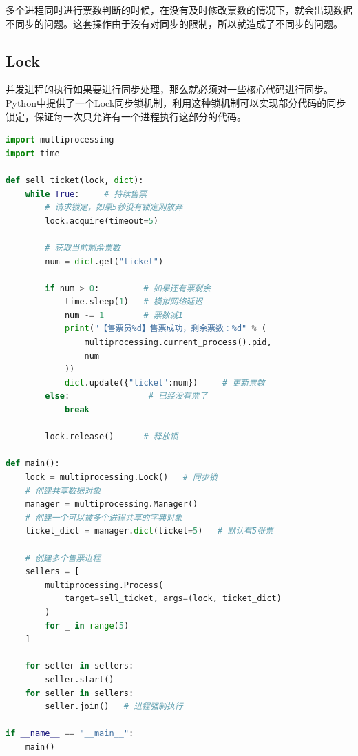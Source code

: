 多个进程同时进行票数判断的时候，在没有及时修改票数的情况下，就会出现数据不同步的问题。这套操作由于没有对同步的限制，所以就造成了不同步的问题。\\

\subsection{Lock}

并发进程的执行如果要进行同步处理，那么就必须对一些核心代码进行同步。Python中提供了一个Lock同步锁机制，利用这种锁机制可以实现部分代码的同步锁定，保证每一次只允许有一个进程执行这部分的代码。

\begin{table}[H]
	\centering
	\caption{Lock类}
\end{table}


\begin{lstlisting}[language=Python]
import multiprocessing
import time

def sell_ticket(lock, dict):
	while True:     # 持续售票
		# 请求锁定，如果5秒没有锁定则放弃
		lock.acquire(timeout=5)
		
		# 获取当前剩余票数
		num = dict.get("ticket")
		
		if num > 0:         # 如果还有票剩余
			time.sleep(1)   # 模拟网络延迟
			num -= 1        # 票数减1
			print("【售票员%d】售票成功，剩余票数：%d" % (
				multiprocessing.current_process().pid,
				num
			))
			dict.update({"ticket":num})     # 更新票数
		else:                # 已经没有票了
			break
		
		lock.release()      # 释放锁

def main():
	lock = multiprocessing.Lock()   # 同步锁
	# 创建共享数据对象
	manager = multiprocessing.Manager()
	# 创建一个可以被多个进程共享的字典对象
	ticket_dict = manager.dict(ticket=5)   # 默认有5张票

	# 创建多个售票进程
	sellers = [
		multiprocessing.Process(
			target=sell_ticket, args=(lock, ticket_dict)
		) 
		for _ in range(5)
	]

	for seller in sellers:
		seller.start()
	for seller in sellers:
		seller.join()   # 进程强制执行

if __name__ == "__main__":
	main()
\end{lstlisting}

